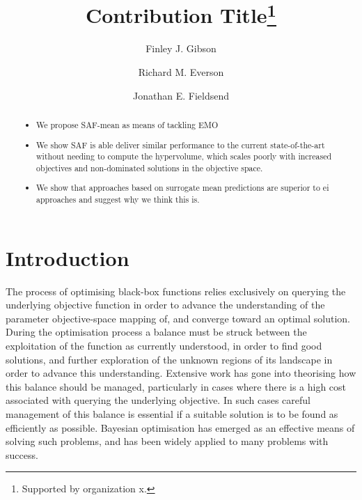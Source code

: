 \documentclass[runningheads]{llncs}
\begin{document}
%
\title{Contribution Title\thanks{Supported by organization x.}}
%

\author{Finley J. Gibson\and
Richard M. Everson\and
Jonathan E. Fieldsend}
%
%
%
\maketitle              %


\begin{abstract}

\begin{itemize}
    \item We propose SAF-mean as means of tackling EMO
    \item We show SAF is able deliver similar performance to the current state-of-the-art without needing to compute the hypervolume, which scales poorly with increased objectives and non-dominated solutions in the objective space.
    \item We show that approaches based on surrogate mean predictions are superior to ei approaches and suggest why we think this is. 
 
\end{itemize}

\end{abstract}
%
%
%
\section{Introduction}
The process of optimising black-box functions relies exclusively on querying the underlying objective function in order to advance the understanding of the parameter objective-space mapping of, and converge toward an optimal solution. During the optimisation process a balance must be struck between the exploitation of the function as currently understood, in order to find good solutions, and further exploration of the unknown regions of its landscape in order to advance this understanding. Extensive work has gone into theorising how this balance should be managed, particularly in cases where there is a high cost associated with querying the underlying objective. In such cases careful management of this balance is essential if a suitable solution is to be found as efficiently as possible. Bayesian optimisation\cite{jones1998efficient} has emerged as an effective means of solving such problems, and has been widely applied to many problems with success.
\end{document}
